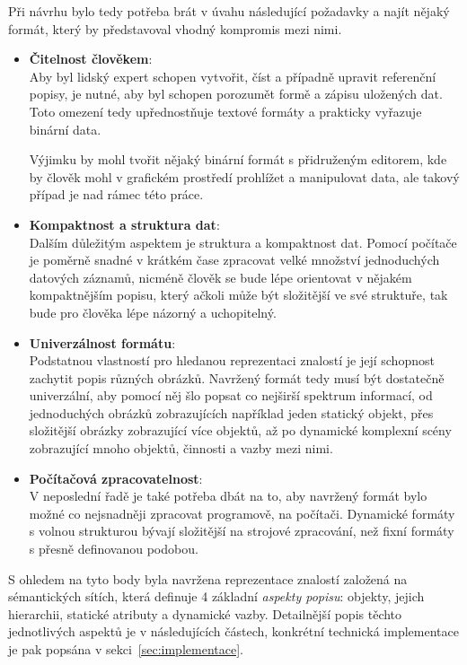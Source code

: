 Při návrhu bylo tedy potřeba brát v úvahu následující požadavky a najít nějaký formát, který by představoval vhodný kompromis mezi nimi.
\begin{itemize}
	\item \textbf{Čitelnost člověkem}:\\
	      Aby byl lidský expert schopen vytvořit, číst a případně upravit referenční popisy,
	      je nutné, aby byl schopen porozumět formě a zápisu uložených dat.
	      Toto omezení tedy upřednostňuje textové formáty a prakticky vyřazuje binární data.

	      Výjimku by mohl tvořit nějaký binární formát s přidruženým editorem,
	      kde by člověk mohl v grafickém prostředí prohlížet a manipulovat data, ale takový případ je nad rámec této práce.
	\item \textbf{Kompaktnost a struktura dat}:\\
	      Dalším důležitým aspektem je struktura a kompaktnost dat.
	      Pomocí počítače je poměrně snadné v krátkém čase zpracovat velké množství jednoduchých datových záznamů,
	      nicméně člověk se bude lépe orientovat v nějakém kompaktnějším popisu, který ačkoli může být složitější ve své struktuře,
	      tak bude pro člověka lépe názorný a uchopitelný.
	\item \textbf{Univerzálnost formátu}:\\
	      Podstatnou vlastností pro hledanou reprezentaci znalostí je její schopnost zachytit popis různých obrázků.
	      Navržený formát tedy musí být dostatečně univerzální, aby pomocí něj šlo popsat co nejširší spektrum informací,
	      od jednoduchých obrázků zobrazujících například jeden statický objekt, přes složitější obrázky zobrazující více objektů,
	      až po dynamické komplexní scény zobrazující mnoho objektů, činnosti a vazby mezi nimi.
	\item \textbf{Počítačová zpracovatelnost}:\\
	      V neposlední řadě je také potřeba dbát na to, aby navržený formát bylo možné co nejsnadněji zpracovat programově, na počítači.
	      Dynamické formáty s volnou strukturou bývají složitější na strojové zpracování, než fixní formáty s přesně definovanou podobou.
\end{itemize}

S ohledem na tyto body byla navržena reprezentace znalostí založená na sémantických sítích,
která definuje 4 základní \emph{aspekty popisu}: objekty, jejich hierarchii, statické atributy a dynamické vazby.
Detailnější popis těchto jednotlivých aspektů je v následujících částech,
konkrétní technická implementace je pak popsána v sekci~\ref{sec:implementace}.

